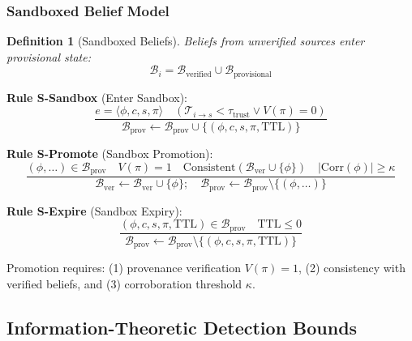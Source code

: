 \documentclass[
]{article}
\newtheorem{definition}{Definition}[section]
\begin{document}
\subsubsection{Sandboxed Belief Model}\label{sec:sandbox-rules}

\begin{definition}[Sandboxed Beliefs]
\label{def:sandbox}
Beliefs from unverified sources enter provisional state:
\begin{equation}
\label{eq:sandbox-partition}
\mathcal{B}_i = \mathcal{B}_{\text{verified}} \cup \mathcal{B}_{\text{provisional}}
\end{equation}
\end{definition}

\textbf{Rule S-Sandbox} (Enter Sandbox): \begin{equation}
\label{eq:rule-sandbox}
\frac{e = \langle \phi, c, s, \pi \rangle \quad (\mathcal{T}_{i \to s} < \tau_{\text{trust}} \lor V(\pi) = 0)}{\mathcal{B}_{\text{prov}} \gets \mathcal{B}_{\text{prov}} \cup \{(\phi, c, s, \pi, \text{TTL})\}}
\end{equation}

\textbf{Rule S-Promote} (Sandbox Promotion): \begin{equation}
\label{eq:rule-promote}
\frac{(\phi, \ldots) \in \mathcal{B}_{\text{prov}} \quad V(\pi) = 1 \quad \text{Consistent}(\mathcal{B}_{\text{ver}} \cup \{\phi\}) \quad |\text{Corr}(\phi)| \geq \kappa}{\mathcal{B}_{\text{ver}} \gets \mathcal{B}_{\text{ver}} \cup \{\phi\}; \quad \mathcal{B}_{\text{prov}} \gets \mathcal{B}_{\text{prov}} \setminus \{(\phi, \ldots)\}}
\end{equation}

\textbf{Rule S-Expire} (Sandbox Expiry): \begin{equation}
\label{eq:rule-expire}
\frac{(\phi, c, s, \pi, \text{TTL}) \in \mathcal{B}_{\text{prov}} \quad \text{TTL} \leq 0}{\mathcal{B}_{\text{prov}} \gets \mathcal{B}_{\text{prov}} \setminus \{(\phi, c, s, \pi, \text{TTL})\}}
\end{equation}

Promotion requires: (1) provenance verification \(V(\pi) = 1\), (2)
consistency with verified beliefs, and (3) corroboration threshold
\(\kappa\).

\subsection{Information-Theoretic Detection
Bounds}\label{sec:detection-bounds}
\end{document}
